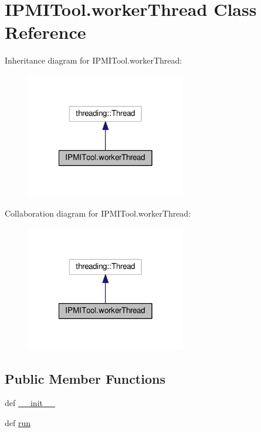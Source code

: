 \hypertarget{classIPMITool_1_1workerThread}{\section{I\-P\-M\-I\-Tool.\-worker\-Thread Class Reference}
\label{classIPMITool_1_1workerThread}
}


Inheritance diagram for I\-P\-M\-I\-Tool.\-worker\-Thread\-:
\nopagebreak
\begin{figure}[H]
\begin{center}
\leavevmode
\includegraphics[width=198pt]{classIPMITool_1_1workerThread__inherit__graph}
\end{center}
\end{figure}


Collaboration diagram for I\-P\-M\-I\-Tool.\-worker\-Thread\-:
\nopagebreak
\begin{figure}[H]
\begin{center}
\leavevmode
\includegraphics[width=198pt]{classIPMITool_1_1workerThread__coll__graph}
\end{center}
\end{figure}
\subsection*{Public Member Functions}
\begin{DoxyCompactItemize}
\item 
def \hyperlink{classIPMITool_1_1workerThread_ae99fbfedf34b12d752aff36969fdb346}{\-\_\-\-\_\-init\-\_\-\-\_\-}
\item 
def \hyperlink{classIPMITool_1_1workerThread_a8584ed7e68afe66df337c3619ad4d1a4}{run}
\end{DoxyCompactItemize}
